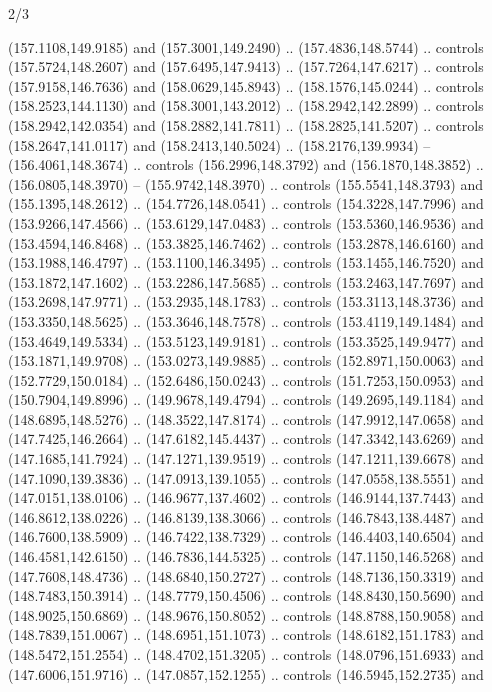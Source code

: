 \begin{flagdescription}{2/3}
\begin{scope}[shift={(0.5\flaglength,0.5)},scale=\flagwidth/320]
\begin{scope}[y=0.8pt, x=0.8pt, yscale=-1,shift={(-118.3,-146)}]
  (157.1108,149.9185) and (157.3001,149.2490) .. (157.4836,148.5744) .. controls
  (157.5724,148.2607) and (157.6495,147.9413) .. (157.7264,147.6217) .. controls
  (157.9158,146.7636) and (158.0629,145.8943) .. (158.1576,145.0244) .. controls
  (158.2523,144.1130) and (158.3001,143.2012) .. (158.2942,142.2899) .. controls
  (158.2942,142.0354) and (158.2882,141.7811) .. (158.2825,141.5207) .. controls
  (158.2647,141.0117) and (158.2413,140.5024) .. (158.2176,139.9934) --
  (156.4061,148.3674) .. controls (156.2996,148.3792) and (156.1870,148.3852) ..
  (156.0805,148.3970) -- (155.9742,148.3970) .. controls (155.5541,148.3793) and
  (155.1395,148.2612) .. (154.7726,148.0541) .. controls (154.3228,147.7996) and
  (153.9266,147.4566) .. (153.6129,147.0483) .. controls (153.5360,146.9536) and
  (153.4594,146.8468) .. (153.3825,146.7462) .. controls (153.2878,146.6160) and
  (153.1988,146.4797) .. (153.1100,146.3495) .. controls (153.1455,146.7520) and
  (153.1872,147.1602) .. (153.2286,147.5685) .. controls (153.2463,147.7697) and
  (153.2698,147.9771) .. (153.2935,148.1783) .. controls (153.3113,148.3736) and
  (153.3350,148.5625) .. (153.3646,148.7578) .. controls (153.4119,149.1484) and
  (153.4649,149.5334) .. (153.5123,149.9181) .. controls (153.3525,149.9477) and
  (153.1871,149.9708) .. (153.0273,149.9885) .. controls (152.8971,150.0063) and
  (152.7729,150.0184) .. (152.6486,150.0243) .. controls (151.7253,150.0953) and
  (150.7904,149.8996) .. (149.9678,149.4794) .. controls (149.2695,149.1184) and
  (148.6895,148.5276) .. (148.3522,147.8174) .. controls (147.9912,147.0658) and
  (147.7425,146.2664) .. (147.6182,145.4437) .. controls (147.3342,143.6269) and
  (147.1685,141.7924) .. (147.1271,139.9519) .. controls (147.1211,139.6678) and
  (147.1090,139.3836) .. (147.0913,139.1055) .. controls (147.0558,138.5551) and
  (147.0151,138.0106) .. (146.9677,137.4602) .. controls (146.9144,137.7443) and
  (146.8612,138.0226) .. (146.8139,138.3066) .. controls (146.7843,138.4487) and
  (146.7600,138.5909) .. (146.7422,138.7329) .. controls (146.4403,140.6504) and
  (146.4581,142.6150) .. (146.7836,144.5325) .. controls (147.1150,146.5268) and
  (147.7608,148.4736) .. (148.6840,150.2727) .. controls (148.7136,150.3319) and
  (148.7483,150.3914) .. (148.7779,150.4506) .. controls (148.8430,150.5690) and
  (148.9025,150.6869) .. (148.9676,150.8052) .. controls (148.8788,150.9058) and
  (148.7839,151.0067) .. (148.6951,151.1073) .. controls (148.6182,151.1783) and
  (148.5472,151.2554) .. (148.4702,151.3205) .. controls (148.0796,151.6933) and
  (147.6006,151.9716) .. (147.0857,152.1255) .. controls (146.5945,152.2735) and

\end{scope}
\end{scope}
\end{flagdescription}
